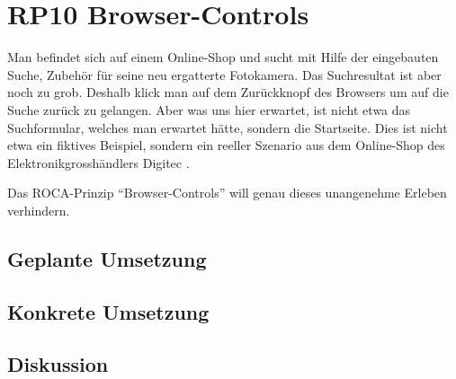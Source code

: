 \section{RP10 Browser-Controls}
\label{sec:principle-rp10-browser-controls}
Man befindet sich auf einem Online-Shop und sucht mit Hilfe der eingebauten Suche, Zubehör für seine neu ergatterte Fotokamera. Das Suchresultat ist aber noch zu grob. Deshalb klick man auf dem Zurückknopf des Browsers um auf die Suche zurück zu gelangen. Aber was uns hier erwartet, ist nicht etwa das Suchformular, welches man erwartet hätte, sondern die Startseite.
Dies ist nicht etwa ein fiktives Beispiel, sondern ein reeller Szenario aus dem Online-Shop des Elektronikgrosshändlers Digitec \cite{Digitec}.

Das ROCA-Prinzip ``Browser-Controls'' will genau dieses unangenehme Erleben verhindern.

\subsection*{Geplante Umsetzung}


\subsection*{Konkrete Umsetzung}


\subsection*{Diskussion}
